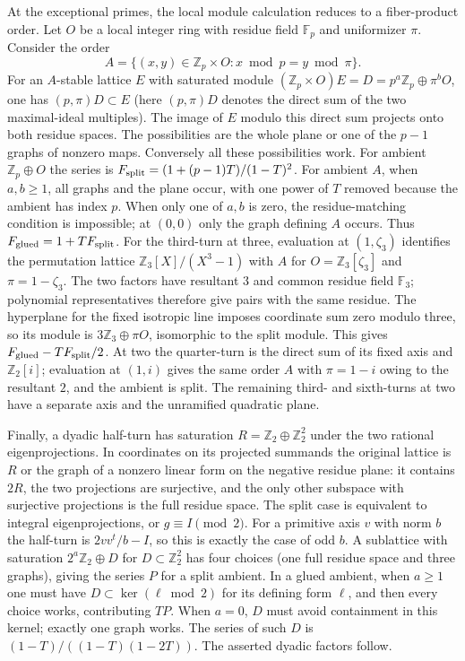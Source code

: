 At the exceptional primes, the local module calculation reduces
to a fiber-product order. Let $O$ be a local integer ring with
residue field $\mathbb F_p$ and uniformizer $\pi$. Consider the order
\[
 A=\{(x,y)\in\mathbb Z_p\times O:x\bmod p=y\bmod\pi\}.
\]
For an $A$-stable lattice $E$ with saturated module
$(\mathbb Z_p\times O)E=D=p^a\mathbb Z_p\oplus\pi^bO$, one has
$(p,\pi)D\subset E$ (here $(p,\pi)D$ denotes the direct sum of the
two maximal-ideal multiples). The image of $E$ modulo this direct sum
projects onto both residue spaces. The possibilities are the whole
plane or one of the $p-1$ graphs of nonzero maps. Conversely all these
possibilities work. For ambient $\mathbb Z_p\oplus O$ the series is
$F_{\rm split}=(1+(p-1)T)/(1-T)^2$. For ambient $A$, when $a,b\ge1$,
all graphs and the plane occur, with one power of $T$ removed because
the ambient has index $p$. When only one of $a,b$ is zero, the
residue-matching condition is impossible; at $(0,0)$ only the graph
defining $A$ occurs. Thus $F_{\rm glued}=1+TF_{\rm split}$.
For the third-turn at three, evaluation at $(1,\zeta_3)$ identifies
the permutation lattice $\mathbb Z_3[X]/(X^3-1)$ with $A$ for
$O=\mathbb Z_3[\zeta_3]$ and $\pi=1-\zeta_3$.
The two factors have resultant $3$ and common residue field
$\mathbb F_3$; polynomial representatives therefore give pairs
with the same residue. The hyperplane for the fixed isotropic line imposes
coordinate sum zero modulo three, so its module is $3\mathbb Z_3
\oplus\pi O$, isomorphic to the split module. This gives
$F_{\rm glued}-TF_{\rm split}/2$. At two the quarter-turn is
the direct sum of its fixed axis and $\mathbb Z_2[i]$; evaluation
at $(1,i)$ gives the same order $A$ with $\pi=1-i$ owing to the
resultant $2$, and the ambient is split. The remaining third- and
sixth-turns at two have a separate axis and the unramified quadratic
plane.

Finally, a dyadic half-turn has saturation
$R=\mathbb Z_2\oplus\mathbb Z_2^2$ under the two rational eigenprojections.
In coordinates on its projected summands the original lattice is $R$
or the graph of a nonzero linear form on the negative residue plane:
it contains $2R$, the two projections are surjective, and the only
other subspace with surjective projections is the full residue space.
The split case is equivalent to integral eigenprojections, or
$g\equiv I\pmod2$. For a primitive axis $v$ with norm $b$ the half-turn
is $2vv^t/b-I$, so this is exactly the case of odd $b$.
A sublattice with saturation $2^a\mathbb Z_2\oplus D$ for
$D\subset\mathbb Z_2^2$ has four choices (one full residue space and
three graphs), giving the series $P$ for a split ambient.
In a glued ambient, when $a\ge1$ one must have
$D\subset\ker(\ell\bmod2)$ for its defining form $\ell$, and then
every choice works, contributing $TP$. When $a=0$, $D$ must avoid
containment in this kernel; exactly one graph works. The series of
such $D$ is $(1-T)/((1-T)(1-2T))$. The asserted dyadic factors follow.

